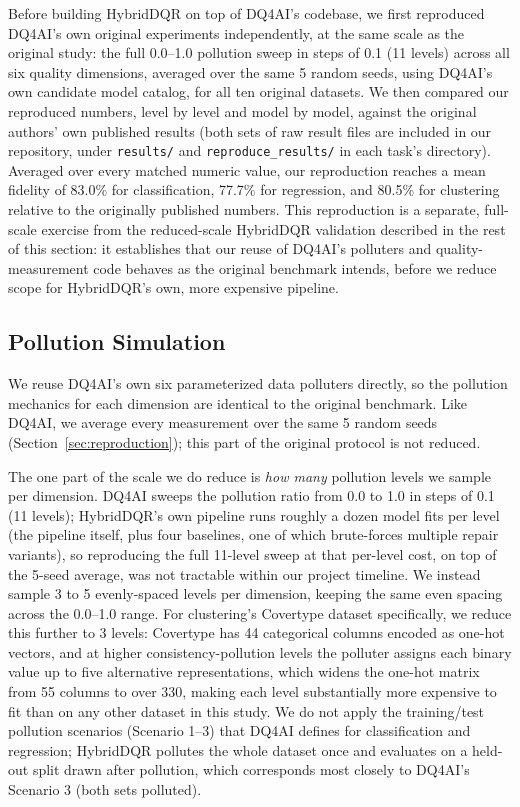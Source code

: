 \documentclass[runningheads]{llncs}
\begin{document}
Before building HybridDQR on top of DQ4AI's codebase, we first
reproduced DQ4AI's own original experiments independently, at the
same scale as the original study: the full 0.0--1.0 pollution sweep
in steps of 0.1 (11 levels) across all six quality dimensions,
averaged over the same 5 random seeds, using DQ4AI's own candidate
model catalog, for all ten original datasets.
We then compared our reproduced numbers,
level by level and model by model, against the original authors'
own published results (both sets of raw result files are included
in our repository, under \texttt{results/} and
\texttt{reproduce\_results/} in each task's directory). Averaged
over every matched numeric value, our reproduction reaches a mean
fidelity of 83.0\% for classification, 77.7\% for regression, and
80.5\% for clustering relative to the originally published numbers.
This reproduction is a separate, full-scale exercise from the
reduced-scale HybridDQR validation described in the rest of this
section: it establishes that our reuse of DQ4AI's polluters and
quality-measurement code behaves as the original benchmark intends,
before we reduce scope for HybridDQR's own, more expensive pipeline.

\subsection{Pollution Simulation}

We reuse DQ4AI's own six parameterized data polluters directly,
so the pollution mechanics for each dimension are identical to
the original benchmark. Like DQ4AI, we average every measurement
over the same 5 random seeds (Section~\ref{sec:reproduction}); this
part of the original protocol is not reduced.

The one part of the scale we do reduce is \emph{how many} pollution
levels we sample per dimension. DQ4AI sweeps the pollution ratio
from 0.0 to 1.0 in steps of 0.1 (11 levels); HybridDQR's own pipeline
runs roughly a dozen model fits per level (the pipeline itself, plus
four baselines, one of which brute-forces multiple repair variants),
so reproducing the full 11-level sweep at that per-level cost, on
top of the 5-seed average, was not tractable within our project
timeline. We instead sample 3 to 5 evenly-spaced levels per
dimension, keeping the same even spacing across the 0.0--1.0 range.
For clustering's Covertype dataset specifically, we reduce this
further to 3 levels: Covertype has 44 categorical columns encoded
as one-hot vectors, and at higher consistency-pollution levels the
polluter assigns each binary value up to five alternative
representations, which widens the one-hot matrix from 55 columns
to over 330, making each level substantially more expensive to fit
than on any other dataset in this study.
We do not apply the training/test pollution scenarios (Scenario
1--3) that DQ4AI defines for classification and regression;
HybridDQR pollutes the whole dataset once and evaluates on a
held-out split drawn after pollution, which corresponds most
closely to DQ4AI's Scenario 3 (both sets polluted).
\end{document}
